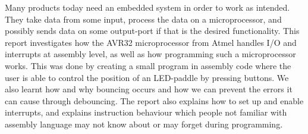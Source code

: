 Many products today need an embedded system in order to work as
intended. They take data from some input, process the data on a
microprocessor, and possibly sends data on some output-port if that is
the desired functionality. This report investigates how the AVR32
microprocessor from Atmel handles I/O and interrupts at assembly level,
as well as how programming such a microprocessor works. This was done by
creating a small program in assembly code where the user is able to
control the position of an LED-paddle by pressing buttons.  We also
learnt how and why bouncing occurs and how we can prevent the errors it can cause through
debouncing. The report also explains how to set up and enable
interrupts, and explains instruction behaviour which people not familiar
with assembly language may not know about or may forget during
programming.

